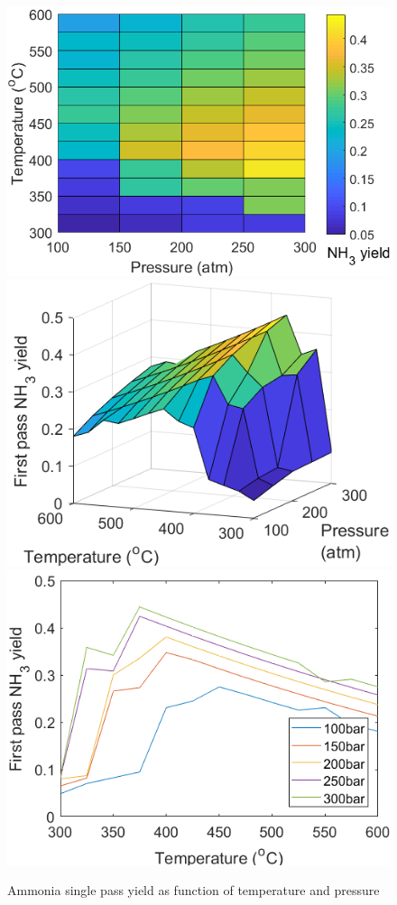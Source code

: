 \documentclass[11pt, a4paper]{article}
\begin{document}
{{\begin{figure}[!htbp]
		{\centering
			\includegraphics[scale=0.38]{TPopNEW1}	
			\includegraphics[scale=0.38]{TPopNEW2}	
			\includegraphics[scale=0.38]{TPopNEW3}
			\caption{Ammonia single pass yield as function of temperature and pressure}	
		}
\end{figure}}

}
\end{document}
